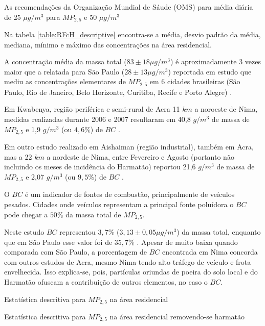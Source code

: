 As recomendações da Organização Mundial de Sáude (OMS) para média diária de 
25 $\mu g/m^3$ para $MP_{2,5}$ e 50 $\mu g/m^3$ 

Na tabela \ref{table:RFcH_descriptive} encontra-se a média, desvio padrão da média, 
mediana, mínimo e máximo das concentrações na área residencial. 

A concentração média da massa total ($83\pm 18 \mu g / m^3$) é aproximadamente
3 vezes maior que a relatada para São Paulo ($28\pm 13 \mu g / m^3$) reportada 
em estudo que mediu as concentrações elementares de $MP_{2,5}$ em 6 cidades 
brasileiras (São Paulo, Rio de Janeiro, Belo Horizonte, Curitiba, Recife e 
Porto Alegre) \cite{andrade2012}. 

Em Kwabenya, região periférica e semi-rural de Acra 11 $km$ a noroeste de Nima, 
medidas realizadas durante 2006 e 2007 resultaram em 40,8 $g / m^3$ de massa de 
$MP_{2,5}$ e 1,9 $g / m^3$ (ou $4,6\%$) de $BC$ \citep{aboh2009}.

Em outro estudo realizado em Aishaiman (região industrial), também em Acra, 
mas a 22 $km$ a nordeste de Nima, entre Fevereiro e Agosto (portanto não 
incluindo os meses de incidência do Harmatão) reportou 21,6 $g / m^3$ de massa 
de $MP_{2,5}$ e 2,07 $g / m^3$ (ou $9,5\%$) de $BC$ \citep{ofosu2012}.

O $BC$ é um indicador de fontes de combustão, principalmente de veículos pesados.
Cidades onde veículos representam a principal fonte poluídora o $BC$ pode chegar 
a $50\%$ da massa total de $MP_{2,5}$.  

Neste estudo $BC$ representou $3,7 \%$ ($3,13\pm 0,05 \mu g / m^3$) da massa 
total, enquanto que em São Paulo esse valor foi de $35,7 \%$ \citep{andrade2012}.
Apesar de muito baixa quando comparada com São Paulo, a porcentagem de $BC$ 
encontrada em Nima concorda com outros estudos de Acra, mesmo Nima tendo alto
tráfego de veículo e frota envelhecida. Isso explica-se, pois, partículas 
oriundas de poeira do solo local e do Harmatão ofuscam a contribuição de outros
elementos, no caso o $BC$. 

\begin{table}[H]
  \centering
    
  \caption{Estatística descritiva para $MP_{2,5}$ na área residencial
            \label{table:RFcH_descriptive}}
\end{table}

\begin{table}[H]
  \centering
    
  \caption{Estatística descritiva para $MP_{2,5}$ na área residencial
           removendo-se harmatão \label{table:RFsH_descriptive}}
\end{table}

